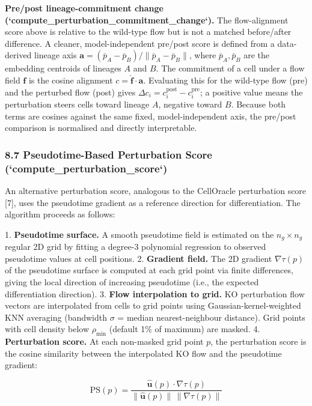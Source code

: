 \documentclass[11pt]{article}
\begin{document}
\textbf{Pre/post lineage-commitment change (`compute\_perturbation\_commitment\_change`).} The flow-alignment score above is relative to the wild-type flow but is not a matched before/after difference. A cleaner, model-independent pre/post score is defined from a data-derived lineage axis $\mathbf{a} = (\bar{p}_A - \bar{p}_B)/\|\bar{p}_A - \bar{p}_B\|$, where $\bar{p}_A, \bar{p}_B$ are the embedding centroids of lineages $A$ and $B$. The commitment of a cell under a flow field $\mathbf{f}$ is the cosine alignment $c = \hat{\mathbf{f}} \cdot \mathbf{a}$. Evaluating this for the wild-type flow (pre) and the perturbed flow (post) gives $\Delta c_i = c_i^{\text{post}} - c_i^{\text{pre}}$; a positive value means the perturbation steers cells toward lineage $A$, negative toward $B$. Because both terms are cosines against the same fixed, model-independent axis, the pre/post comparison is normalised and directly interpretable.


\subsubsection*{8.7 Pseudotime-Based Perturbation Score (`compute\_perturbation\_score`)}

An alternative perturbation score, analogous to the CellOracle perturbation score [7], uses the pseudotime gradient as a reference direction for differentiation. The algorithm proceeds as follows:

1. \textbf{Pseudotime surface.} A smooth pseudotime field is estimated on the $n_g \times n_g$ regular 2D grid by fitting a degree-3 polynomial regression to observed pseudotime values at cell positions.
2. \textbf{Gradient field.} The 2D gradient $\nabla \tau(p)$ of the pseudotime surface is computed at each grid point via finite differences, giving the local direction of increasing pseudotime (i.e., the expected differentiation direction).
3. \textbf{Flow interpolation to grid.} KO perturbation flow vectors are interpolated from cells to grid points using Gaussian-kernel-weighted KNN averaging (bandwidth $\sigma$ = median nearest-neighbour distance). Grid points with cell density below $\rho_{\min}$ (default 1\% of maximum) are masked.
4. \textbf{Perturbation score.} At each non-masked grid point $p$, the perturbation score is the cosine similarity between the interpolated KO flow and the pseudotime gradient:

\begin{equation}
\mathrm{PS}(p) = \frac{\hat{\mathbf{u}}(p) \cdot \nabla\tau(p)}{\|\hat{\mathbf{u}}(p)\|\,\|\nabla\tau(p)\|} 
\end{equation}
\end{document}
